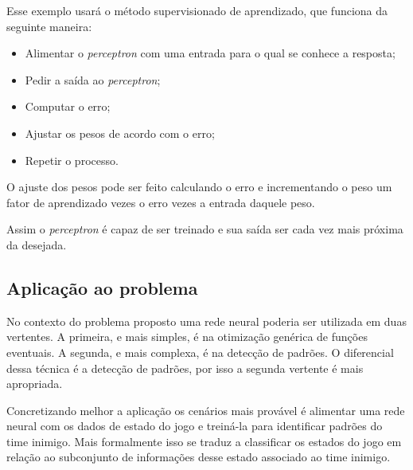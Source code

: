 Esse exemplo usará o método supervisionado de aprendizado, que funciona da seguinte maneira:

\begin{itemize}
\item
  Alimentar o \textit{perceptron} com uma entrada para o qual se conhece a resposta;
\item
  Pedir a saída ao \textit{perceptron};
\item
  Computar o erro;
\item
  Ajustar os pesos de acordo com o erro;
\item
  Repetir o processo.
\end{itemize}

O ajuste dos pesos pode ser feito calculando o erro e incrementando o peso um fator de
aprendizado vezes o erro vezes a entrada daquele peso.

Assim o \textit{perceptron} é capaz de ser treinado e sua saída ser cada vez mais próxima da desejada.




\subsection{Aplicação ao problema}

No contexto do problema proposto uma rede neural poderia ser utilizada em duas vertentes.
A primeira, e mais simples, é na otimização genérica de funções eventuais.
A segunda, e mais complexa, é na detecção de padrões.
O diferencial dessa técnica é a detecção de padrões, por isso a segunda vertente é mais apropriada.

Concretizando melhor a aplicação os cenários mais provável é alimentar uma rede neural
com os dados de estado do jogo e treiná-la para identificar padrões do time inimigo.
Mais formalmente isso se traduz a classificar os estados do jogo em relação ao subconjunto de
informações desse estado associado ao time inimigo.

